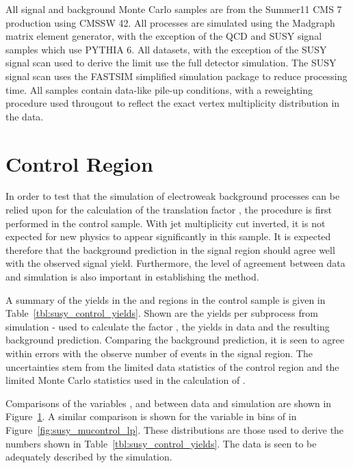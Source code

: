 

All signal and background Monte Carlo samples are from the Summer11 \ac{CMS}
\unit{7}{\TeV} production using \ac{CMSSW} 42. All processes are simulated using
the Madgraph matrix element generator, with the exception of the \ac{QCD} and
\ac{SUSY} signal samples which use \ac{PYTHIA} 6. All datasets, with the
exception of the \ac{SUSY} signal scan used to derive the limit use the full
detector simulation. The \ac{SUSY} signal scan uses the \ac{FASTSIM} simplified
simulation package to reduce processing time. All samples contain data-like
pile-up conditions, with a reweighting procedure used througout to reflect the
exact vertex multiplicity distribution in the data.


\section{Control Region}
In order to test that the simulation of electroweak background processes can be
relied upon for the calculation of the translation factor \RCS, the procedure is
first performed in the control sample. With jet multiplicity cut inverted, it is
not expected for new physics to appear significantly in this sample. It is
expected therefore that the background prediction in the signal region should
agree well with the observed signal yield. Furthermore, the level of agreement
between data and simulation is also important in establishing the method.

A summary of the yields in the \LPcontrol and \LPsignal regions in the control
sample is given in Table~\ref{tbl:susy_control_yields}. Shown are the yields per
subprocess from simulation - used to calculate the factor \RCS, the yields in
data and the resulting background prediction. Comparing the background
prediction, it is seen to agree within errors with the observe number of events
in the signal region. The uncertainties stem from the limited data statistics of
the control region and the limited Monte Carlo statistics used in the
calculation of \RCS.



Comparisons of the variables \STlep, \MT and \Ptmu between data and simulation
are shown in Figure~\ref{fig:susy_mucontrol_kin}. A similar comparison is shown
for the \LP variable in bins of \STlep in
Figure~\ref{fig:susy_mucontrol_lp}. These distributions are those used to derive
the numbers shown in Table~\ref{tbl:susy_control_yields}. The data is seen to be
adequately described by the simulation.
\begin{figure}
\centering
{}\quad
{}\quad
{}
\caption[]{}
\label{fig:susy_mucontrol_kin}
\end{figure}

